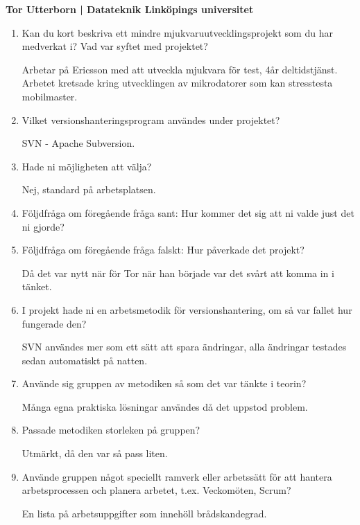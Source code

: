 \clearpage
\begin{center}
    \textbf{Tor Utterborn | Datateknik Linköpings universitet}
\end{center}
\begin{enumerate}

  \item Kan du kort beskriva ett mindre mjukvaruutvecklingsprojekt som du har medverkat i? Vad var syftet med projektet?

  Arbetar på Ericsson med att utveckla mjukvara för test, 4år deltidstjänst.
  Arbetet kretsade kring utvecklingen av mikrodatorer som kan stresstesta mobilmaster.

  \item Vilket versionshanteringsprogram användes under projektet?

  SVN - Apache Subversion.

  \item Hade ni möjligheten att välja?

  Nej, standard på arbetsplatsen.

  \item Följdfråga om föregående fråga sant: Hur kommer det sig att ni valde just det ni gjorde?
  \item Följdfråga om föregående fråga falskt: Hur påverkade det projekt?

  Då det var nytt när för Tor när han började var det svårt att komma in i tänket.

  \item I projekt hade ni en arbetsmetodik för versionshantering, om så var fallet hur fungerade den?

  SVN användes mer som ett sätt att spara ändringar, alla ändringar testades sedan automatiskt på natten.

  \item Använde sig gruppen av metodiken så som det var tänkte i teorin?

  Många egna praktiska lösningar användes då det uppstod problem.

  \item Passade metodiken storleken på gruppen?

  Utmärkt, då den var så pass liten.

  \item Använde gruppen något speciellt ramverk eller arbetssätt för att hantera arbetsprocessen och planera arbetet, t.ex. Veckomöten, Scrum?

  En lista på arbetsuppgifter som innehöll brådskandegrad.


\end{enumerate}
